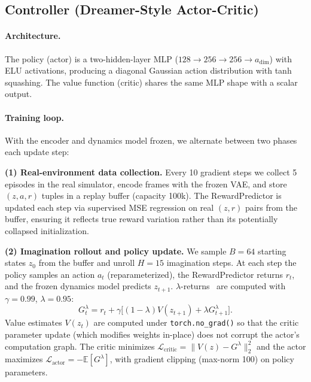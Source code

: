 \documentclass{article}
\begin{document}
\subsection{Controller (Dreamer-Style Actor-Critic)}

\paragraph{Architecture.}
The policy (actor) is a two-hidden-layer MLP ($128 \to 256 \to 256 \to a_\text{dim}$)
with ELU activations, producing a diagonal Gaussian action distribution with tanh
squashing.
The value function (critic) shares the same MLP shape with a scalar output.

\paragraph{Training loop.}
With the encoder and dynamics model frozen, we alternate between two phases each update step:

\textbf{(1) Real-environment data collection.}
Every 10 gradient steps we collect 5 episodes in the real simulator, encode frames with
the frozen VAE, and store $(z, a, r)$ tuples in a replay buffer (capacity 100k).
The RewardPredictor is updated each step via supervised MSE regression on real $(z, r)$
pairs from the buffer, ensuring it reflects true reward variation rather than its
potentially collapsed initialization.

\textbf{(2) Imagination rollout and policy update.}
We sample $B=64$ starting states $z_0$ from the buffer and unroll $H=15$ imagination
steps.
At each step the policy samples an action $a_t$ (reparameterized), the RewardPredictor
returns $r_t$, and the frozen dynamics model predicts $z_{t+1}$.
$\lambda$-returns~\cite{sutton2018rl} are computed with $\gamma=0.99$, $\lambda=0.95$:
\begin{equation}
  G_t^\lambda = r_t + \gamma\bigl[(1-\lambda)V(z_{t+1}) + \lambda G_{t+1}^\lambda\bigr].
\end{equation}
Value estimates $V(z_t)$ are computed under \texttt{torch.no\_grad()} so that the critic
parameter update (which modifies weights in-place) does not corrupt the actor's
computation graph.
The critic minimizes $\mathcal{L}_\text{critic}=\|V(z) - G^\lambda\|_2^2$ and the actor
maximizes $\mathcal{L}_\text{actor}=-\mathbb{E}[G^\lambda]$, with gradient clipping
(max-norm 100) on policy parameters.
\end{document}
